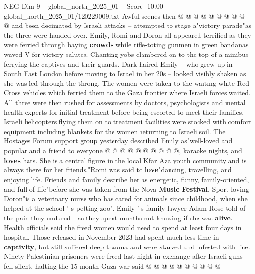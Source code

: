 \begin{textsample}{NEG Dim 9 – global\_north\_2025\_01 – Score -10.00 – global\_north\_2025\_01/120229009.txt}
Awful scenes then @ @ @ @ @ @ @ @ @ @ and been decimated by Israeli attacks -- attempted to stage a"victory parade"as the three were handed over.
Emily, Romi and Doron all appeared terrified as they were ferried through baying \textbf{crowds} while rifle-toting gunmen in green bandanas waved V-for-victory salutes.
Chanting yobs clambered on to the top of a minibus ferrying the captives and their guards.
Dark-haired Emily -- who grew up in South East London before moving to Israel in her 20s -- looked visibly shaken as she was led through the throng.
The women were taken to the waiting white Red Cross vehicles which ferried them to the Gaza frontier where Israeli forces waited.
All three were then rushed for assessments by doctors, psychologists and mental health experts for initial treatment before being escorted to meet their families.
Israeli helicopters flying them on to treatment facilities were stocked with comfort equipment including blankets for the women returning to Israeli soil.
The Hostages Forum support group yesterday described Emily as"well-loved and popular and a friend to everyone @ @ @ @ @ @ @ @ @ @, karaoke nights, and \textbf{loves} hats.
She is a central figure in the local Kfar Aza youth community and is always there for her friends."Romi was said to \textbf{love}"dancing, travelling, and enjoying life.
Friends and family describe her as energetic, funny, family-oriented, and full of life"before she was taken from the Nova \textbf{Music} \textbf{Festival}.
Sport-loving Doron"is a veterinary nurse who has cared for animals since childhood, when she helped at the school ' s petting zoo".
Emily ' s family lawyer Adam Rose told of the pain they endured - as they spent months not knowing if she was \textbf{alive}.
Health officials said the freed women would need to spend at least four days in hospital.
Those released in November 2023 had spent much less time in \textbf{captivity}, but still suffered deep trauma and were starved and infested with lice.
Ninety Palestinian prisoners were freed last night in exchange after Israeli guns fell silent, halting the 15-month Gaza war said @ @ @ @ @ @ @ @ @ @

\end{textsample}
